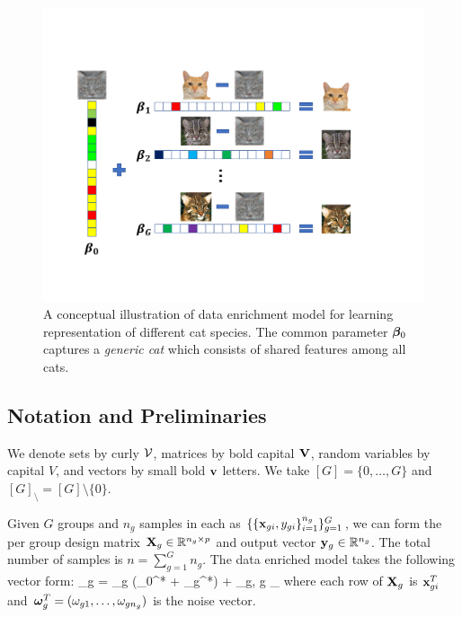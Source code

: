 \begin{figure}
		\centering
		\includegraphics[scale=.45]{./img/concept.pdf}
		\caption{A conceptual illustration of data enrichment model for learning representation of  different cat species. The common parameter $\boldsymbol{\beta}_0$ captures a \emph{generic cat} which consists of shared features among all cats.}
		\label{fig:cat}		
\end{figure}



\subsection{Notation and Preliminaries}
We denote sets by curly $\cV$, matrices by bold capital $\mathbf{V}$, random variables by capital $V$, and vectors by small bold $\mathbf{v}$ letters.
We take $[G] = \{0, \dots, G\}$ and $[G]_\setminus = [G] \setminus \{0\}$.

Given $G$ groups and $n_g$ samples in each as $\{ \{\mathbf{x}_{gi}, y_{gi} \}_{i=1}^{n_g} \}_{g = 1}^G$, we can form the per group design matrix $\mathbf{X}_g \in \mathbb R^{n_g \times p}$ and output vector $\mathbf{y}_g \in \mathbb R ^{n_g}$.
The total number of samples is  $n = \sum_{g = 1}^{G} n_g$.
The data enriched model takes the following vector form:
\be
\label{eq:dirtymodel}
\y_g = \X_g (\bbeta _0^* + \bbeta _g^*) + \oomega_g,  \quad \forall g \in [G]_\setminus
\ee
where each row of $\mathbf{X}_g$ is $\mathbf{x}_{gi}^T$ and $\boldsymbol{\omega}_g^T = (\omega_{g1}, \dots, \omega_{gn_g})$ is the noise vector.

